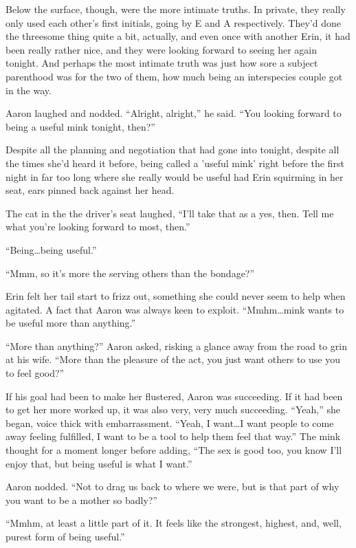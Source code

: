 \documentclass[12pt,letterpaper,oneside]{memoir}
\begin{document}
  Below the surface, though, were the more intimate truths. In private, they really only used each other's first initials, going by E and A respectively. They'd done the threesome thing quite a bit, actually, and even once with another Erin, it had been really rather nice, and they were looking forward to seeing her again tonight. And perhaps the most intimate truth was just how sore a subject parenthood was for the two of them, how much being an interspecies couple got in the way.

  Aaron laughed and nodded. ``Alright, alright,'' he said. ``You looking forward to being a useful mink tonight, then?''

  Despite all the planning and negotiation that had gone into tonight, despite all the times she'd heard it before, being called a 'useful mink' right before the first night in far too long where she really would be useful had Erin squirming in her seat, ears pinned back against her head.

  The cat in the the driver's seat laughed, ``I'll take that as a yes, then. Tell me what you're looking forward to most, then.''

  ``Being\ldots{}being useful.''

  ``Mmm, so it's more the serving others than the bondage?''

  Erin felt her tail start to frizz out, something she could never seem to help when agitated. A fact that Aaron was always keen to exploit. ``Mmhm\ldots{}mink wants to be useful more than anything.''

  ``More than anything?'' Aaron asked, risking a glance away from the road to grin at his wife. ``More than the pleasure of the act, you just want others to use you to feel good?''

  If his goal had been to make her flustered, Aaron was succeeding. If it had been to get her more worked up, it was also very, very much succeeding. ``Yeah,'' she began, voice thick with embarrassment. ``Yeah, I want\ldots{}I want people to come away feeling fulfilled, I want to be a tool to help them feel that way.'' The mink thought for a moment longer before adding, ``The sex is good too, you know I'll enjoy that, but being useful is what I want.''

  Aaron nodded. ``Not to drag us back to where we were, but is that part of why you want to be a mother so badly?''

  ``Mmhm, at least a little part of it. It feels like the strongest, highest, and, well, purest form of being useful.''
\end{document}
